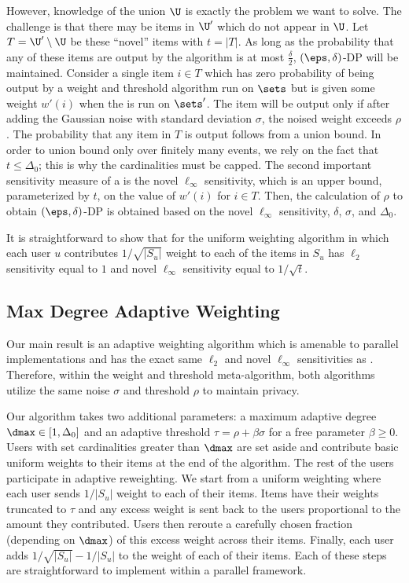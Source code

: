 However, knowledge of the union $\U$ is exactly the problem we want to solve. The challenge is that there may be items in $\U'$ which do not appear in $\U$. Let $T = \U' \setminus \U$ be these ``novel'' items with $t = |T|$. As long as the probability that any of these items are output by the algorithm is at most $\frac{\delta}{2}$, $(\eps, \delta)$-DP will be maintained. Consider a single item $i \in T$ which has zero probability of being output by a weight and threshold algorithm run on $\sets$ but is given some weight $w'(i)$ when the \weightalgo{} is run on $\sets'$. The item will be output only if after adding the Gaussian noise with standard deviation $\sigma$, the noised weight exceeds $\rho$. The probability that any item in $T$ is output follows from a union bound. In order to union bound only over finitely many events, we rely on the fact that $t \leq \Delta_0$; this is why the cardinalities must be capped. The second important sensitivity measure of a \weightalgo{} is the novel $\ell_\infty$ sensitivity, which is an upper bound, parameterized by $t$, on the value of $w'(i)$ for $i \in T$. Then, the calculation of $\rho$ to obtain $(\eps, \delta)$-DP is obtained based on the novel $\ell_\infty$ sensitivity, $\delta$, $\sigma$, and $\Delta_0$.

It is straightforward to show that for the uniform weighting algorithm \basicalgo{} in which each user $u$ contributes $1/\sqrt{|S_u|}$ weight to each of the items in $S_u$ has $\ell_2$ sensitivity equal to $1$ and novel $\ell_\infty$ sensitivity equal to $1/\sqrt{t}$.

\subsection{Max Degree Adaptive Weighting}

Our main result is an adaptive weighting algorithm \ouralgo{} which is amenable to parallel implementations and has the exact same $\ell_2$ and novel $\ell_\infty$ sensitivities as \basicalgo{}. Therefore, within the weight and threshold meta-algorithm, both algorithms utilize the same noise $\sigma$ and threshold $\rho$ to maintain privacy.

Our algorithm takes two additional parameters: a maximum adaptive degree $\dmax \in [1, \Delta_0]$ and an adaptive threshold $\tau = \rho + \beta \sigma$ for a free parameter $\beta \geq 0$. Users with set cardinalities greater than $\dmax$ are set aside and contribute basic uniform weights to their items at the end of the algorithm. The rest of the users participate in adaptive reweighting. We start from a uniform weighting where each user sends $1/|S_u|$ weight to each of their items. Items have their weights truncated to $\tau$ and any excess weight is sent back to the users proportional to the amount they contributed. Users then reroute a carefully chosen fraction (depending on $\dmax$) of this excess weight across their items. Finally, each user adds $1/\sqrt{|S_u|} - 1/|S_u|$ to the weight of each of their items. Each of these steps are straightforward to implement within a parallel framework.

